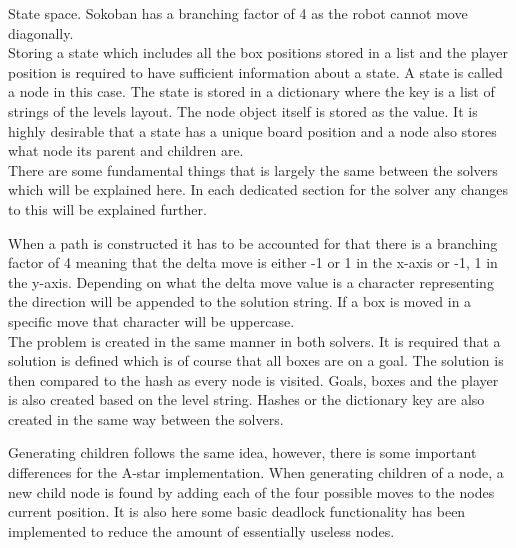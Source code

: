 \documentclass[../../main.tex]{subfiles}
\begin{document}
State space.
Sokoban has a branching factor of 4 as the robot cannot move diagonally. \\	

Storing a state which includes all the box positions stored in a list and the player position is required to have 				sufficient 	information about a state. A state is called a node in this case. The state is stored in a dictionary where 		the key is a list of strings of the levels layout. The node object itself is stored as the value. It is highly desirable that a 	state has a unique board position and a node also stores what node its parent and children are. \\

There are some fundamental things that is largely the same between the solvers which will be explained here. In each dedicated section for the solver any changes to this will be explained further.

When a path is constructed it has to be accounted for that there is a branching factor of 4 meaning that the delta move is either -1 or 1 in the x-axis or -1, 1 in the y-axis. Depending on what the delta move value is a character representing the direction will be appended to the solution string. If a box is moved in a specific move that character will be uppercase. \\

The problem is created in the same manner in both solvers. It is required that a solution is defined which is of course that all boxes are on a goal. The solution is then compared to the hash as every node is visited. Goals, boxes and the player is also created based on the level string. Hashes or the dictionary key are also created in the same way between the solvers. 

Generating children follows the same idea, however, there is some important differences for the A-star implementation. When generating children of a node, a new child node is found by adding each of the four possible moves to the nodes current position. It is also here some basic deadlock functionality has been implemented to reduce the amount of essentially useless nodes.
\end{document}
